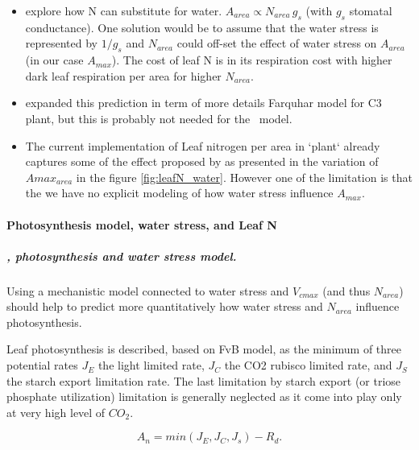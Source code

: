 \documentclass[a4paper,11pt]{article}
\begin{document}
\begin{itemize}
\item \citet{Wright-2003} explore how N can substitute for water. $A_{area} \propto N_{area} \, g_s$ (with $g_s$ stomatal conductance). One solution would be to assume that the water stress is represented by $1/g_s$ and $N_{area}$ could off-set the effect of water stress on $A_{area}$ (in our case $A_{max}$). The cost of leaf N is in its respiration cost with higher dark leaf respiration per area for higher $N_{area}$.

\item \citet{Prentice-2014} expanded this prediction in term of more details Farquhar model for C3 plant, but this is probably not needed for the \plant\ model.


\item The current implementation of Leaf nitrogen per area in `plant` already captures some of the effect proposed by \citet{Wright-2003} as presented in the variation of $A{max}_{area}$ in the figure \ref{fig:leafN_water}. However one of the limitation is that the we have no explicit modeling of how water stress influence $A_{max}$.
\end{itemize}

\paragraph{Photosynthesis model, water stress, and Leaf N}

\subparagraph{\citet{Collatz-1991}, photosynthesis and water stress model.}

Using a mechanistic model connected to water stress and $V_{cmax}$ (and thus $N_{area}$) should help to predict more quantitatively how water stress and $N_{area}$ influence photosynthesis.



Leaf photosynthesis is described, based on FvB model, as the minimum
of three potential rates $J_E$ the light limited rate, $J_C$ the CO2
rubisco limited rate, and $J_S$ the starch export limitation rate. The
last limitation by starch export (or triose phosphate utilization)
limitation is generally neglected as it come into play only at very
high level of $CO_2$. 

\begin{equation}
\label{eq:An}
A_n= min(J_E, J_C, J_s) - R_d.
\end{equation}
\end{document}
